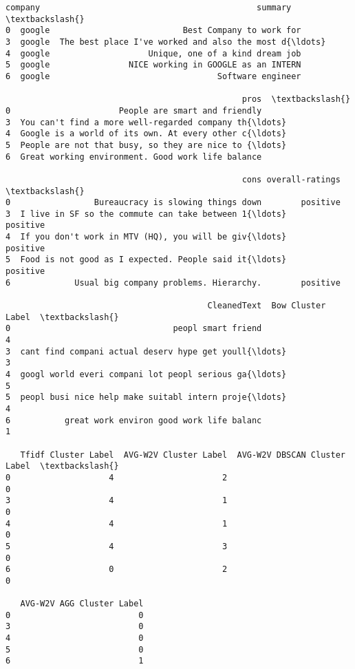 \documentclass[11pt]{article}
\makeatletter
\newcommand{\boxspacing}{\kern\kvtcb@left@rule\kern\kvtcb@boxsep}
\newcommand{\prompt}[4]{
        \ttfamily\llap{{\color{#2}[#3]:\hspace{3pt}#4}}\vspace{-\baselineskip}
    }
\makeatother
\begin{document}
            \begin{tcolorbox}[breakable, size=fbox, boxrule=.5pt, pad at break*=1mm, opacityfill=0]
\prompt{Out}{outcolor}{298}{\boxspacing}
\begin{Verbatim}[commandchars=\\\{\}]
  company                                            summary  \textbackslash{}
0  google                           Best Company to work for
3  google  The best place I've worked and also the most d{\ldots}
4  google                    Unique, one of a kind dream job
5  google                NICE working in GOOGLE as an INTERN
6  google                                  Software engineer

                                                pros  \textbackslash{}
0                      People are smart and friendly
3  You can't find a more well-regarded company th{\ldots}
4  Google is a world of its own. At every other c{\ldots}
5  People are not that busy, so they are nice to {\ldots}
6  Great working environment. Good work life balance

                                                cons overall-ratings  \textbackslash{}
0                 Bureaucracy is slowing things down        positive
3  I live in SF so the commute can take between 1{\ldots}        positive
4  If you don't work in MTV (HQ), you will be giv{\ldots}        positive
5  Food is not good as I expected. People said it{\ldots}        positive
6             Usual big company problems. Hierarchy.        positive

                                         CleanedText  Bow Cluster Label  \textbackslash{}
0                                 peopl smart friend                  4
3  cant find compani actual deserv hype get youll{\ldots}                  3
4  googl world everi compani lot peopl serious ga{\ldots}                  5
5  peopl busi nice help make suitabl intern proje{\ldots}                  4
6           great work environ good work life balanc                  1

   Tfidf Cluster Label  AVG-W2V Cluster Label  AVG-W2V DBSCAN Cluster Label  \textbackslash{}
0                    4                      2                             0
3                    4                      1                             0
4                    4                      1                             0
5                    4                      3                             0
6                    0                      2                             0

   AVG-W2V AGG Cluster Label
0                          0
3                          0
4                          0
5                          0
6                          1
\end{Verbatim}
\end{tcolorbox}
        
\end{document}
